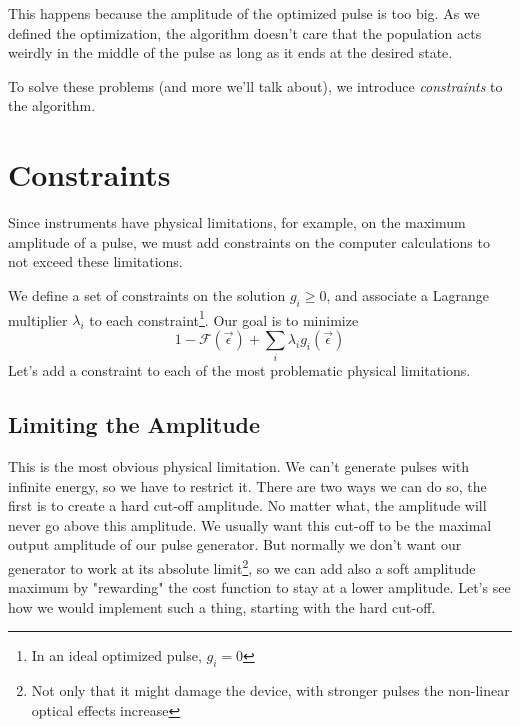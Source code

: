 This happens because the amplitude of the optimized pulse is too big. As we defined the optimization, the algorithm doesn't care that the population acts weirdly in the middle of the pulse as long as it ends at the desired state.

To solve these problems (and more we'll talk about), we introduce \textit{constraints} to the algorithm.

\section{Constraints}
Since instruments have physical limitations, for example, on the maximum amplitude of a pulse, we must add constraints on the computer calculations to not exceed these limitations.

We define a set of constraints on the solution ${g_i \ge 0}$, and associate a Lagrange multiplier $\lambda_i$ to each constraint\footnote{In an ideal optimized pulse, $g_i = 0$}. \newline
Our goal is to minimize 
\[
    1 - \mathcal{F} (\vec{\epsilon}) + \sum_i \lambda_i g_i (\vec{\epsilon})
\]
Let's add a constraint to each of the most problematic physical limitations.
\subsection{Limiting the Amplitude}
This is the most obvious physical limitation. We can't generate pulses with infinite energy, so we have to restrict it. There are two ways we can do so, the first is to create a hard cut-off amplitude. No matter what, the amplitude will never go above this amplitude. We usually want this cut-off to be the  maximal output amplitude of our pulse generator. But normally we don't want our generator to work at its absolute limit\footnote{Not only that it might damage the device, with stronger pulses the non-linear optical effects increase}, so we can add also a soft amplitude maximum by "rewarding" the cost function to stay at a lower amplitude. Let's see how we would implement such a thing, starting with the hard cut-off.

